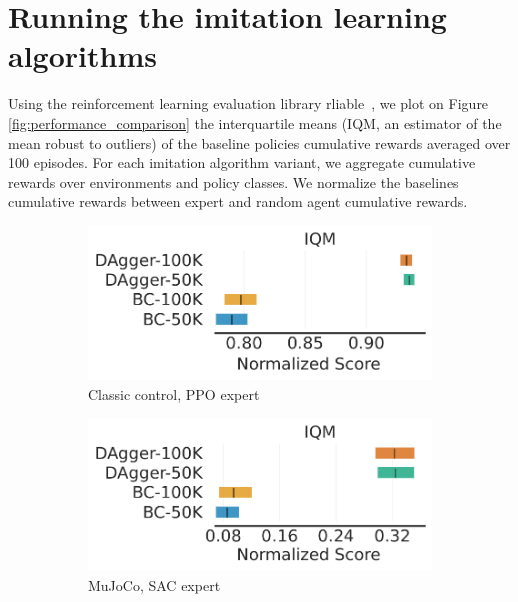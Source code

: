 \section{Running the imitation learning algorithms}
Using the reinforcement learning evaluation library rliable~\cite{rliable}, we plot on Figure \ref{fig:performance_comparison} the interquartile means (IQM, an estimator of the mean robust to outliers) of the baseline policies cumulative rewards averaged over 100 episodes.
For each imitation algorithm variant, we aggregate cumulative rewards over environments and policy classes.
We normalize the baselines cumulative rewards between expert and random agent cumulative rewards.

\begin{figure}[ht]
\centering
\begin{subfigure}{.33\textwidth}
  \centering
  \includegraphics[width=\linewidth]{images/images_part3/ppo_expert_classic_control.pdf}
  \caption{Classic control, PPO expert}
  \label{fig:ppo_classic}
\end{subfigure}%
\begin{subfigure}{.33\textwidth}
  \centering
  \includegraphics[width=\linewidth]{images/images_part3/sac_expert_mujoco.pdf}
  \caption{MuJoCo, SAC expert}
  \label{fig:sac_mujoco}
\end{subfigure}
\begin{subfigure}{.33\textwidth}

\end{subfigure}
\end{figure}
